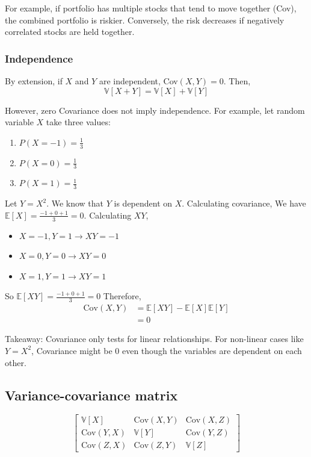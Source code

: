 \documentclass[../Probability.tex]{subfiles}
\begin{document}
\noindent For example, if portfolio has multiple stocks that tend to move together (Cov), the combined
portfolio is riskier. Conversely, the risk decreases if negatively correlated stocks are held together.

\subsubsection{Independence}

\medskip
\noindent By extension, if $X$ and $Y$ are independent, Cov$(X,Y)=0$. Then,
\[\mathbb{V}[X+Y]=\mathbb{V}[X]+\mathbb{V}[Y]\]

\medskip
\noindent However, zero Covariance does not imply independence. \newline
For example, let random variable $X$ take three values:
\begin{enumerate}
    \item $P(X=-1)=\frac{1}{3}$
    \item $P(X=0)=\frac{1}{3}$
    \item $P(X=1)=\frac{1}{3}$
\end{enumerate}
Let $Y=X^2$.\newline
We know that $Y$ is dependent on $X$.\newline
Calculating covariance,\newline
We have $\mathbb{E}[X]=\frac{-1+0+1}{3}=0$.\newline
Calculating $XY$,
\begin{itemize}
    \item $X=-1,Y=1\rightarrow XY=-1$
    \item $X=0,Y=0\rightarrow XY=0$
    \item $X=1,Y=1\rightarrow XY=1$
\end{itemize}
So $\mathbb{E}[XY]=\frac{-1+0+1}{3}=0$\newline
Therefore,
\begin{align*}
    \text{Cov}(X,Y)&=\mathbb{E}[XY]-\mathbb{E}[X]\mathbb{E}[Y] \\
    &=0
\end{align*}

\noindent Takeaway: Covariance only tests for linear relationships. For non-linear
cases like $Y=X^2$, Covariance might be 0 even though the variables are dependent on each other.

\subsection{Variance-covariance matrix}
\[
\begin{bmatrix}
    \mathbb{V}[X] & \text{Cov}(X, Y) & \text{Cov}(X, Z) \\
    \text{Cov}(Y, X) & \mathbb{V}[Y] & \text{Cov}(Y, Z) \\
    \text{Cov}(Z, X) & \text{Cov}(Z, Y) & \mathbb{V}[Z]
\end{bmatrix}
\]
\end{document}
